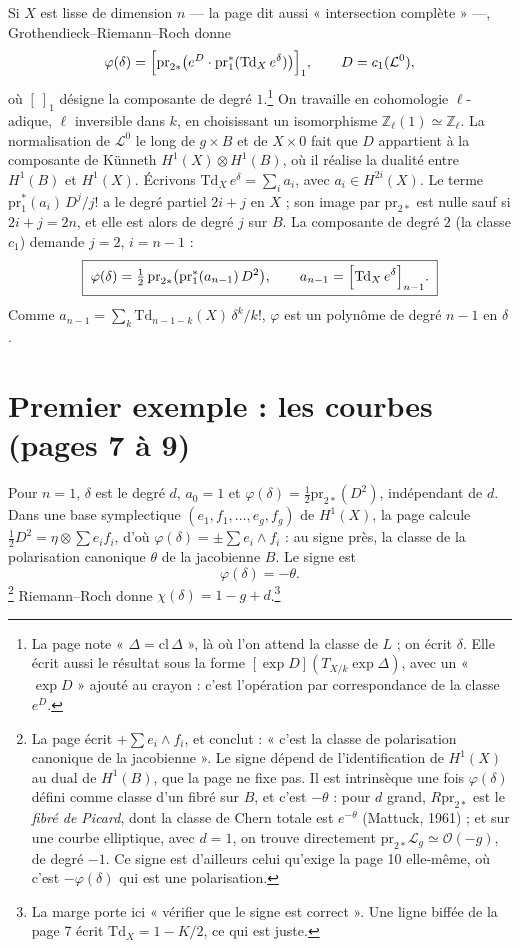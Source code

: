 \documentclass[11pt,a4paper]{article}
\begin{document}
Si $X$ est lisse de dimension $n$ — la page dit aussi « intersection
complète » —, Grothendieck--Riemann--Roch donne
\[
\varphi(\delta) = \Bigl[\mathrm{pr}_{2*}\bigl(e^{D}\cdot
\mathrm{pr}_1^{*}(\mathrm{Td}_X\, e^{\delta})\bigr)\Bigr]_{1},
\qquad D = c_1(\mathcal{L}^{0}),
\]
où $[\ ]_1$ désigne la composante de degré $1$.\footnote{La page note
« $\Delta = \mathrm{cl}\,\Delta$ », là où l'on attend la classe de $L$ ; on
écrit $\delta$. Elle écrit aussi le résultat sous la forme $[\exp D](T_{X/k}
\exp \Delta)$, avec un « $\exp D$ » ajouté au crayon : c'est l'opération par
correspondance de la classe $e^{D}$.} On travaille en cohomologie
$\ell$-adique, $\ell$ inversible dans $k$, en choisissant un isomorphisme
$\mathbb{Z}_\ell(1) \simeq \mathbb{Z}_\ell$. La normalisation de
$\mathcal{L}^{0}$ le long de $g \times B$ et de $X \times 0$ fait que $D$
appartient à la composante de Künneth $H^{1}(X) \otimes H^{1}(B)$, où il
réalise la dualité entre $H^{1}(B)$ et $H^{1}(X)$. Écrivons
$\mathrm{Td}_X\, e^{\delta} = \sum_{i} a_i$, avec $a_i \in H^{2i}(X)$. Le terme
$\mathrm{pr}_1^{*}(a_i)\,D^{j}/j!$ a le degré partiel $2i + j$ en $X$ ; son
image par $\mathrm{pr}_{2*}$ est nulle sauf si $2i + j = 2n$, et elle est alors
de degré $j$ sur $B$. La composante de degré $2$ (la classe $c_1$) demande
$j = 2$, $i = n - 1$ :
\[
\boxed{\;\varphi(\delta) = \tfrac{1}{2}\,\mathrm{pr}_{2*}\bigl(\mathrm{pr}_1^{*}(a_{n-1})\, D^{2}\bigr),
\qquad a_{n-1} = \Bigl[\mathrm{Td}_X\, e^{\delta}\Bigr]_{n-1}.\;}
\]
Comme $a_{n-1} = \sum_{k} \mathrm{Td}_{n-1-k}(X)\,\delta^{k}/k!$,
$\varphi$ est un polynôme de degré $n - 1$ en $\delta$.

\section*{Premier exemple : les courbes (pages 7 à 9)}

Pour $n = 1$, $\delta$ est le degré $d$, $a_0 = 1$ et
$\varphi(\delta) = \tfrac{1}{2}\mathrm{pr}_{2*}(D^{2})$, indépendant de $d$. Dans
une base symplectique $(e_1, f_1, \ldots, e_g, f_g)$ de $H^{1}(X)$, la page
calcule $\tfrac{1}{2}D^{2} = \eta \otimes \sum e_i f_i$, d'où
$\varphi(\delta) = \pm \sum e_i \wedge f_i$ : au signe près, la classe de la
polarisation canonique $\theta$ de la jacobienne $B$. Le signe est
\[
\varphi(\delta) = -\theta .
\]
\footnote{La page écrit $+\sum e_i \wedge f_i$, et conclut : « c'est la classe
de polarisation canonique de la jacobienne ». Le signe dépend de
l'identification de $H^{1}(X)$ au dual de $H^{1}(B)$, que la page ne fixe pas.
Il est intrinsèque une fois $\varphi(\delta)$ défini comme classe d'un fibré
sur $B$, et c'est $-\theta$ : pour $d$ grand, $R\mathrm{pr}_{2*}$ est le
\emph{fibré de Picard}, dont la classe de Chern totale est $e^{-\theta}$
(Mattuck, 1961) ; et sur une courbe elliptique, avec $d = 1$, on trouve
directement $\mathrm{pr}_{2*}\mathcal{L}_g \simeq \mathcal{O}(-g)$, de degré
$-1$. Ce signe est d'ailleurs celui qu'exige la page 10 elle-même, où c'est
$-\varphi(\delta)$ qui est une polarisation.} Riemann--Roch donne
$\chi(\delta) = 1 - g + d$.\footnote{La marge porte ici « vérifier que le
signe est correct ». Une ligne biffée de la page 7 écrit
$\mathrm{Td}_X = 1 - K/2$, ce qui est juste.}
\end{document}
